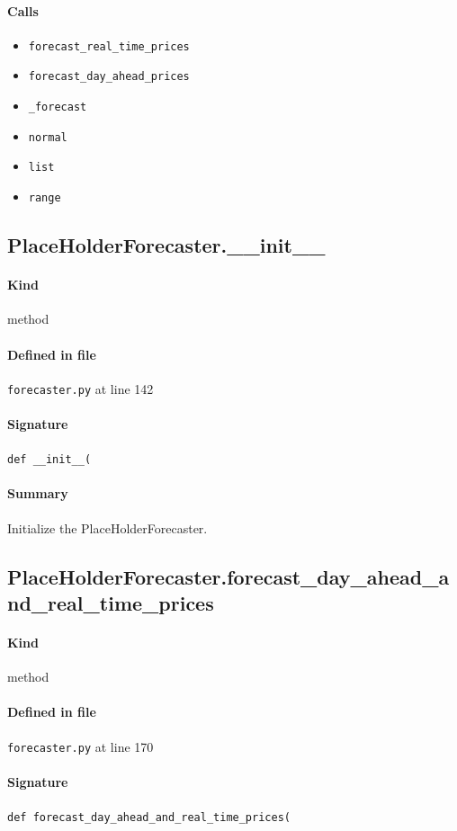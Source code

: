 \documentclass[11pt]{report}
\begin{document}
\paragraph{Calls}
\begin{itemize}[leftmargin=*]
  \item \texttt{forecast\_real\_time\_prices}
  \item \texttt{forecast\_day\_ahead\_prices}
  \item \texttt{\_forecast}
  \item \texttt{normal}
  \item \texttt{list}
  \item \texttt{range}
\end{itemize}
\subsection{PlaceHolderForecaster.\_\_init\_\_}
\label{def:forecaster.py:PlaceHolderForecaster.__init__:L142}
\paragraph{Kind} method
\paragraph{Defined in file} \texttt{forecaster.py} at line 142
\paragraph{Signature} \texttt{def \_\_init\_\_(}
\paragraph{Summary} Initialize the PlaceHolderForecaster.
\subsection{PlaceHolderForecaster.forecast\_day\_ahead\_and\_real\_time\_prices}
\label{def:forecaster.py:PlaceHolderForecaster.forecast_day_ahead_and_real_time_prices:L170}
\paragraph{Kind} method
\paragraph{Defined in file} \texttt{forecaster.py} at line 170
\paragraph{Signature} \texttt{def forecast\_day\_ahead\_and\_real\_time\_prices(}
\end{document}
